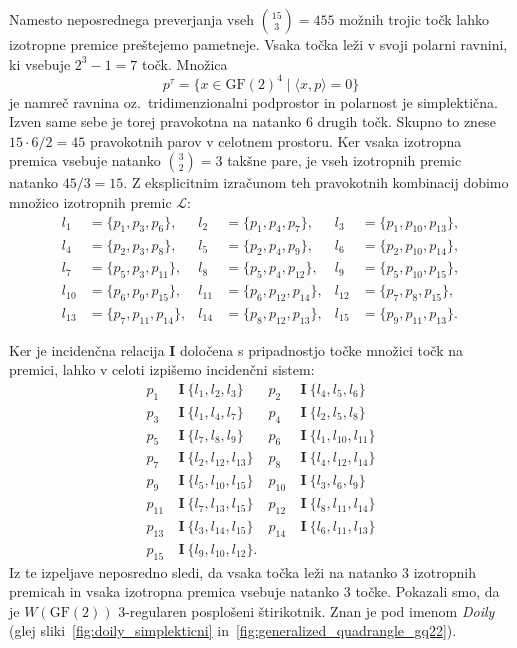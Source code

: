 \documentclass[fin1, tisk]{fmfdelo}
\newcommand{\II}{\mathbf{I}}
\newcommand{\LL}{\mathcal{L}}
\newcommand{\GF}{\mathrm{GF}}
\begin{document}
\begin{zgled}
    Namesto neposrednega preverjanja vseh $\binom{15}{3} = 455$ možnih trojic točk lahko izotropne premice preštejemo pametneje. 
    Vsaka točka leži v svoji polarni ravnini, ki vsebuje $2^3 - 1 = 7$
    točk. Množica \[p^\tau = \{x\in \GF(2)^4\mid\langle x, p\rangle = 0\}\] je namreč ravnina
    oz.~tridimenzionalni podprostor in polarnost je simplektična. 
    Izven same sebe je torej pravokotna na 
    natanko $6$ drugih točk. Skupno to znese $15 \cdot 6 / 2 = 45$ pravokotnih parov v celotnem prostoru. 
    Ker vsaka izotropna premica vsebuje natanko $\binom{3}{2} = 3$ takšne pare, je vseh izotropnih premic natanko $45 / 3 = 15$. 
    Z eksplicitnim izračunom teh pravokotnih kombinacij dobimo množico izotropnih premic $\LL$:
    \begin{align*}
        l_1 &= \{p_1, p_3, p_6\}, & l_2 &= \{p_1, p_4, p_7\}, & l_3 &= \{p_1, p_{10}, p_{13}\}, \\
        l_4 &= \{p_2, p_3, p_8\}, & l_5 &= \{p_2, p_4, p_9\}, & l_6 &= \{p_2, p_{10}, p_{14}\}, \\
        l_7 &= \{p_5, p_3, p_{11}\}, & l_8 &= \{p_5, p_4, p_{12}\}, & l_9 &= \{p_5, p_{10}, p_{15}\}, \\
        l_{10} &= \{p_6, p_9, p_{15}\}, & l_{11} &= \{p_6, p_{12}, p_{14}\}, & l_{12} &= \{p_7, p_8, p_{15}\}, \\
        l_{13} &= \{p_7, p_{11}, p_{14}\}, & l_{14} &= \{p_8, p_{12}, p_{13}\}, & l_{15} &= \{p_9, p_{11}, p_{13}\}.
    \end{align*}

    Ker je incidenčna relacija $\II$ določena s pripadnostjo točke množici točk na premici, 
    lahko v celoti izpišemo incidenčni sistem:
    \begin{align*}
        p_1 & \ \II \ \{ l_1, l_2, l_3 \} & p_2 & \ \II \ \{ l_4, l_5, l_6 \} \\
        p_3 & \ \II \ \{ l_1, l_4, l_7 \} & p_4 & \ \II \ \{ l_2, l_5, l_8 \} \\
        p_5 & \ \II \ \{ l_7, l_8, l_9 \} & p_6 & \ \II \ \{ l_1, l_{10}, l_{11} \} \\
        p_7 & \ \II \ \{ l_2, l_{12}, l_{13} \} & p_8 & \ \II \ \{ l_4, l_{12}, l_{14} \} \\
        p_9 & \ \II \ \{ l_5, l_{10}, l_{15} \} & p_{10} & \ \II \ \{ l_3, l_6, l_9 \} \\
        p_{11} & \ \II \ \{ l_7, l_{13}, l_{15} \} & p_{12} & \ \II \ \{ l_8, l_{11}, l_{14} \} \\
        p_{13} & \ \II \ \{ l_3, l_{14}, l_{15} \} & p_{14} & \ \II \ \{ l_6, l_{11}, l_{13} \} \\
        p_{15} & \ \II \ \{ l_9, l_{10}, l_{12} \}.
    \end{align*}
    Iz te izpeljave neposredno sledi, da vsaka točka leži na natanko $3$ izotropnih premicah in vsaka izotropna premica 
    vsebuje natanko $3$ točke. Pokazali 
    smo, da je $W(\GF(2))$ $3$-regularen posplošeni štirikotnik. 
    Znan je pod imenom \emph{Doily} (glej sliki~\ref{fig:doily_simplekticni} in~\ref{fig:generalized_quadrangle_gq22}).
\end{zgled}
\end{document}
